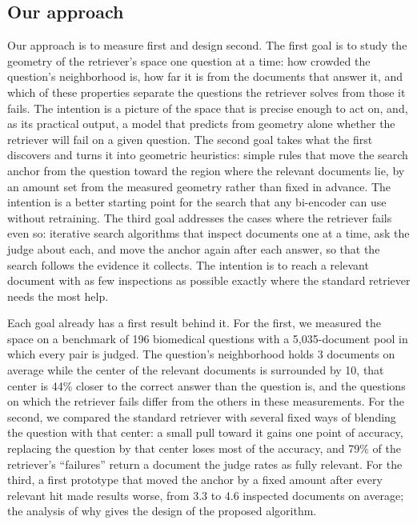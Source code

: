 \documentclass[12pt,a4paper]{article}
\begin{document}
\subsection{Our approach}
\label{sec:approach}

Our approach is to measure first and design second. The first goal is to study the geometry of the retriever's space one question at a time: how crowded the question's neighborhood is, how far it is from the documents that answer it, and which of these properties separate the questions the retriever solves from those it fails. The intention is a picture of the space that is precise enough to act on, and, as its practical output, a model that predicts from geometry alone whether the retriever will fail on a given question. The second goal takes what the first discovers and turns it into geometric heuristics: simple rules that move the search anchor from the question toward the region where the relevant documents lie, by an amount set from the measured geometry rather than fixed in advance. The intention is a better starting point for the search that any bi-encoder can use without retraining. The third goal addresses the cases where the retriever fails even so: iterative search algorithms that inspect documents one at a time, ask the judge about each, and move the anchor again after each answer, so that the search follows the evidence it collects. The intention is to reach a relevant document with as few inspections as possible exactly where the standard retriever needs the most help.

Each goal already has a first result behind it. For the first, we measured the space on a benchmark of 196 biomedical questions with a 5,035-document pool in which every pair is judged. The question's neighborhood holds 3 documents on average while the center of the relevant documents is surrounded by 10, that center is 44\% closer to the correct answer than the question is, and the questions on which the retriever fails differ from the others in these measurements. For the second, we compared the standard retriever with several fixed ways of blending the question with that center: a small pull toward it gains one point of accuracy, replacing the question by that center loses most of the accuracy, and 79\% of the retriever's ``failures'' return a document the judge rates as fully relevant. For the third, a first prototype that moved the anchor by a fixed amount after every relevant hit made results worse, from 3.3 to 4.6 inspected documents on average; the analysis of why gives the design of the proposed algorithm.
\end{document}
